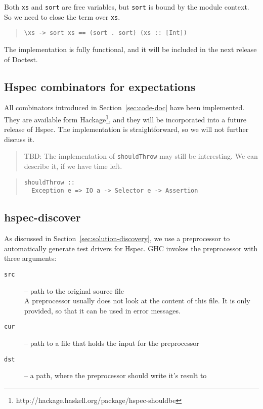 \documentclass[preprint]{sigplanconf}
\begin{document}
\noindent Both \verb|xs| and \verb|sort| are free variables, but
\verb|sort| is bound by the module context.  So we need to close the
term over \verb|xs|.

\begin{quote}
\small
\begin{verbatim}
\xs -> sort xs == (sort . sort) (xs :: [Int])
\end{verbatim}
\end{quote}

The implementation is fully functional, and it will be included in the
next release of Doctest.


\subsection{Hspec combinators for expectations}
\label{sec:hspec-comb}

\noindent All combinators introduced in Section~\ref{sec:code-doc} have been
implemented.  They are available form Hackage\footnote{%
http://hackage.haskell.org/package/hspec-shouldbe},
and they will be incorporated into a future
release of Hspec.
The implementation is straightforward, so we will not further discuss
it.

\begin{quote}
    TBD: The implementation of \verb|shouldThrow| may still be
    interesting.  We can describe it, if we have time left.
\end{quote}

\begin{quote}
\small
\begin{verbatim}
shouldThrow ::
  Exception e => IO a -> Selector e -> Assertion
\end{verbatim}
\end{quote}

\subsection{hspec-discover}
\label{sec:implementation-discovery}

As discussed in Section~\ref{sec:solution-discovery}, we use a preprocessor to
automatically generate test drivers for Hspec.  GHC invokes the
preprocessor with three arguments:

\begin{description}
    \item[{\tt src}]
        -- path to the original source file\\
        A preprocessor usually does not
        look at the content of this file.  It is only provided, so
        that it can be used in error messages.
    \item[{\tt cur}]
        -- path to a file that holds the input for the preprocessor
    \item[{\tt dst}]
        -- a path, where the preprocessor should write it's result to
\end{description}
\end{document}

